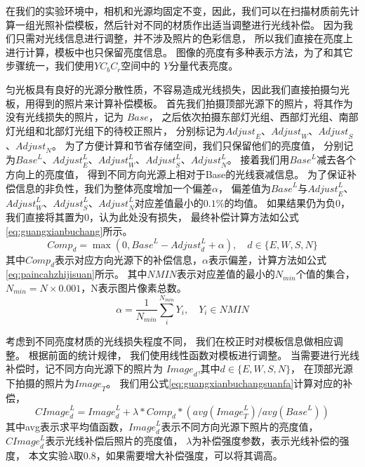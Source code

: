 在我们的实验环境中，相机和光源均固定不变，因此，我们可以在扫描材质前先计算一组光照补偿模板，然后针对不同的材质作出适当调整进行光线补偿。
因为我们只需对光线信息进行调整，并不涉及照片的色彩信息，
所以我们直接在亮度上进行计算，模板中也只保留亮度信息。
图像的亮度有多种表示方法，为了和其它步骤统一，我们使用$YC_b C_r$空间中的
$Y$分量代表亮度。

匀光板具有良好的光源分散性质，不容易造成光线损失，因此我们直接拍摄匀光板，用得到的照片来计算补偿模板。
首先我们拍摄顶部光源下的照片，将其作为没有光线损失的照片，记为
$Base$，
之后依次拍摄东部灯光组、西部灯光组、南部灯光组和北部灯光组下的待校正照片，
分别标记为${Adjust}_E$、${Adjust}_W$、${Adjust}_S$、${Adjust}_N$。
为了方便计算和节省存储空间，我们只保留他们的亮度值，
分别记为${Base}^L$、${Adjust}_E^L$、${Adjust}_W^L$、${Adjust}_S^L$、${Adjust}_N^L$。
接着我们用${Base}^L$减去各个方向上的亮度值，
得到不同方向光源上相对于Base的光线衰减信息。
为了保证补偿信息的非负性，我们为整体亮度增加一个偏差$\alpha$，
偏差值为${Base}^L$与${Adjust}_E^L$、${Adjust}_W^L$、${Adjust}_S^L$、${Adjust}_N^L$对应差值最小的$0.1\%$的均值。
如果结果仍为负0，我们直接将其置为0，认为此处没有损失，
最终补偿计算方法如公式\eqref{eq:guangxianbuchang}所示。
\begin{equation}\label{eq:guangxianbuchang}
{Comp}_d=\max ({0,{Base}^L-{Adjust}_d^L+\alpha }),\quad d\in \{E,W,S,N \}
\end{equation}
其中${Comp}_d$表示对应方向光源下的补偿信息，$\alpha$表示偏差，计算方法如公式\eqref{eq:paincahzhijisuan}所示。
其中$NMIN$表示对应差值的最小的$N_{min}$个值的集合，$N_{min}=N\times 0.001$，N表示图片像素总数。
\begin{equation}\label{eq:paincahzhijisuan}
\alpha =\frac {1}{N_{min}} \sum_{i}^{N_{min}}{Y_i},\quad Y_i\in NMIN
\end{equation}

考虑到不同亮度材质的光线损失程度不同，
我们在校正时对模板信息做相应调整。
根据前面的统计规律，
我们使用线性函数对模板进行调整。
当需要进行光线补偿时，记不同方向光源下的照片为
${Image}_d$,其中$d \in \{E,W,S,N\}$，
在顶部光源下拍摄的照片为${Image}_T$。
我们用公式\eqref{eq:guangxianbuchangsuanfa}计算对应的补偿，
\begin{equation}
\label{eq:guangxianbuchangsuanfa}
{CImage}_d^L={Image}_d^L+\lambda*{Comp}_d*(avg({Image}_T^L)/avg({Base}^L))
\end{equation}
其中avg表示求平均值函数，${Image}_d^L$表示不同方向光源下照片的亮度值，
${CImage}_d^L$表示光线补偿后照片的亮度值，
$\lambda$为补偿强度参数，表示光线补偿的强度，
本文实验$\lambda$取$0.8$，如果需要增大补偿强度，可以将其调高。


